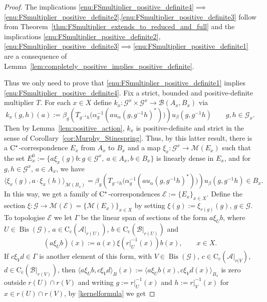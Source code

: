 \documentclass[11 pt, leqno]{amsart}
\numberwithin{equation}{section}
\theoremstyle{plain}
\theoremstyle{definition}
\newcommand*{\contc}{\mathrm{C_c}}%
\DeclareMathOperator{\Bis}{Bis}
\newcommand{\B}{\mathcal B}
\newcommand{\M}{\mathcal M}
\newcommand{\G}{\mathcal G} %
\newcommand{\EE}{\mathcal E}
\newcommand{\A}{\mathcal A}
\newcommand{\cst}{\ifmmode\mathrm{C}^*\else{$\mathrm{C}^*$}\fi}
\begin{document}
\begin{proof} 
The implications \ref{enu:FSmultiplier_positive_definite4}$\implies$\ref{enu:FSmultiplier_positive_definite2},\ref{enu:FSmultiplier_positive_definite3} follow from Theorem~\ref{thm:FSmultiplier_extends_to_reduced_and_full} and the implications \ref{enu:FSmultiplier_positive_definite2},\ref{enu:FSmultiplier_positive_definite3}$\implies$\ref{enu:FSmultiplier_positive_definite1} are a consequence of Lemma~\ref{lem:completely_positive_implies_positive_definite}.

Thus we only need to prove that \ref{enu:FSmultiplier_positive_definite1} implies \ref{enu:FSmultiplier_positive_definite4}. 
Fix a strict, bounded  and positive-definite multiplier $T$. 
For each $x \in X$ define $k_x : \G^x \times \G^x \to \B(A_x,B_x)$ via
\[
    k_x(g, h)(a) := \beta_{g} \left(T_{g^{-1} h} \big( \alpha_g^{-1} (au_{\alpha}(g,g^{-1}h)^*) \big) \right) u_{\beta} (g,g^{-1}h) %
    \qquad g, h \in \G_x. 
\]
Then by Lemma~\ref{lem:positive_action}, $k_x$ is positive-definite and strict in the sense of Corollary~\ref{cor:Murphy_Stinespring}. 
Thus, by this latter result, there is a $\cst$-correspondence $E_x$ from $A_x$ to $B_x$ and a map $\xi_x : \G^x \to \M(E_x)$ such that the set $E_x^0 := \{ a \xi_x(g)b : g \in \G^x ,\ a \in A_x, b \in B_x \}$ is linearly dense in $E_x$, and for $g, h \in \G^x$, $a \in A_x$, we have 
\begin{equation} \label{kernelformula}
    \langle \xi_x(g), a \cdot \xi_x(h) \rangle_{\M(B_x)} =  \beta_{g} \left(T_{g^{-1} h} \big(\alpha_g^{-1}(au_{\alpha}(g,g^{-1}h)^*) \big) \right)u_{\beta}(g,g^{-1}h) \in B_x. 
\end{equation}
In this way, we get a family of $\cst$-correspondences $\EE:=\{E_x\}_{x\in X}$. 
Define the section $\xi : \G \to \M(\EE) = \{ \M(E_x) \}_{x\in X}$ by setting $\xi(g):=\xi_{r(g)}(g)$, $g \in \G$.
To topologise $\EE$ we let $\Gamma$ be the linear span of sections of the form $a\xi_U b$, where $U\in \Bis(\G)$, $a\in \contc(\A|_{r(U)})$, $b\in \contc(\B|_{r(U)})$ and
\[
    (a\xi_U b)(x) := a(x) \xi(r|_{U}^{-1}(x))b(x) , \qquad x\in X.
\]
If $c\xi_V d\in \Gamma$ is another element of this form, with $V\in \Bis(\G)$, $c\in \contc(\A|_{r(V})$, $d\in \contc (\B|_{r(V)})$, then $\langle a\xi_U b, c \xi_V d\rangle_{B} (x):=  \langle a\xi_U b(x), c \xi_V d (x)\rangle_{B_x}$ is zero outside $r(U)\cap r(V)$ and writing $g := r|_{U}^{-1}(x)$ and $h := r|_{V}^{-1}(x)$ for $x\in r(U)\cap r(V)$, by \eqref{kernelformula} we get 

\end{proof}
\end{document}
